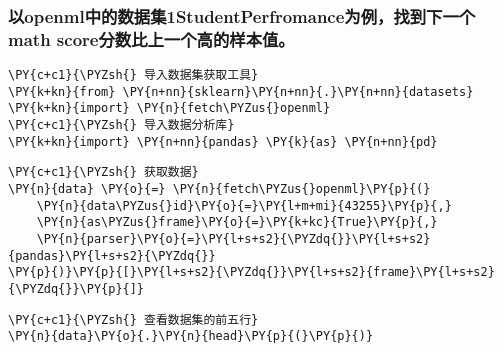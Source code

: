     \hypertarget{ux4ee5openmlux4e2dux7684ux6570ux636eux96c61studentperfromanceux4e3aux4f8bux627eux5230ux4e0bux4e00ux4e2amath-scoreux5206ux6570ux6bd4ux4e0aux4e00ux4e2aux9ad8ux7684ux6837ux672cux503c}{%
\subsubsection{以openml中的数据集1StudentPerfromance为例，找到下一个math
score分数比上一个高的样本值。}\label{ux4ee5openmlux4e2dux7684ux6570ux636eux96c61studentperfromanceux4e3aux4f8bux627eux5230ux4e0bux4e00ux4e2amath-scoreux5206ux6570ux6bd4ux4e0aux4e00ux4e2aux9ad8ux7684ux6837ux672cux503c}}

    \begin{tcolorbox}[breakable, size=fbox, boxrule=1pt, pad at break*=1mm,colback=cellbackground, colframe=cellborder]
\begin{Verbatim}[commandchars=\\\{\}]
\PY{c+c1}{\PYZsh{} 导入数据集获取工具}
\PY{k+kn}{from} \PY{n+nn}{sklearn}\PY{n+nn}{.}\PY{n+nn}{datasets} \PY{k+kn}{import} \PY{n}{fetch\PYZus{}openml}
\PY{c+c1}{\PYZsh{} 导入数据分析库}
\PY{k+kn}{import} \PY{n+nn}{pandas} \PY{k}{as} \PY{n+nn}{pd}
\end{Verbatim}
\end{tcolorbox}

    \begin{tcolorbox}[breakable, size=fbox, boxrule=1pt, pad at break*=1mm,colback=cellbackground, colframe=cellborder]
\begin{Verbatim}[commandchars=\\\{\}]
\PY{c+c1}{\PYZsh{} 获取数据}
\PY{n}{data} \PY{o}{=} \PY{n}{fetch\PYZus{}openml}\PY{p}{(}
    \PY{n}{data\PYZus{}id}\PY{o}{=}\PY{l+m+mi}{43255}\PY{p}{,}
    \PY{n}{as\PYZus{}frame}\PY{o}{=}\PY{k+kc}{True}\PY{p}{,}
    \PY{n}{parser}\PY{o}{=}\PY{l+s+s2}{\PYZdq{}}\PY{l+s+s2}{pandas}\PY{l+s+s2}{\PYZdq{}}
\PY{p}{)}\PY{p}{[}\PY{l+s+s2}{\PYZdq{}}\PY{l+s+s2}{frame}\PY{l+s+s2}{\PYZdq{}}\PY{p}{]}
\end{Verbatim}
\end{tcolorbox}

    \begin{tcolorbox}[breakable, size=fbox, boxrule=1pt, pad at break*=1mm,colback=cellbackground, colframe=cellborder]
\begin{Verbatim}[commandchars=\\\{\}]
\PY{c+c1}{\PYZsh{} 查看数据集的前五行}
\PY{n}{data}\PY{o}{.}\PY{n}{head}\PY{p}{(}\PY{p}{)}
\end{Verbatim}
\end{tcolorbox}

